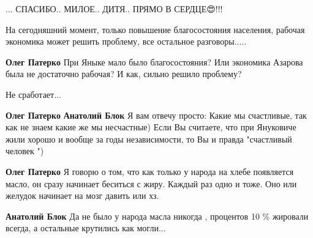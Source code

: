 \begin{itemize}
... СПАСИБО.. МИЛОЕ.. ДИТЯ.. ПРЯМО В СЕРДЦЕ😍!!!

 
На сегодняшний момент, только повышение благосостояния населения, рабочая
экономика может решить проблему, все остальное разговоры.....

\begin{itemize}
 
\textbf{Олег Патерко} При Яныке мало было благосостояния? Или экономика Азарова была не достаточно рабочая? И как, сильно решило проблему?

 
Не сработает...

\textbf{Олег Патерко}
\textbf{Анатолий Блок} Я вам отвечу просто: Какие мы счастливые, так как не знаем какие же мы несчастные) Если Вы считаете, что при Януковиче жили хорошо и вообще за годы независимости, то Вы и правда "счастливый человек ")

 
\textbf{Олег Патерко} Я говорю о том, что как только у народа на хлебе появляется масло, он сразу начинает беситься с жиру. Каждый раз одно и тоже. Оно или желудок начинает на мозг давить или хз.

 
\textbf{Анатолий Блок} Да не было у народа масла никогда , процентов 10 \% жировали всегда, а остальные крутились как могли...


\end{itemize}
\end{itemize}
